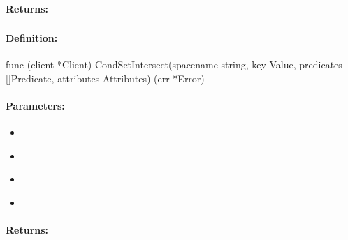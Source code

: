\paragraph{Returns:}


\pagebreak
\subsubsection{}
\label{api:Go:CondSetIntersect}


\paragraph{Definition:}
\begin{gocode}
func (client *Client) CondSetIntersect(spacename string, key Value, predicates []Predicate, attributes Attributes) (err *Error)
\end{gocode}

\paragraph{Parameters:}
\begin{itemize}[noitemsep]
\item {}\\

\item {}\\

\item {}\\

\item {}\\

\end{itemize}

\paragraph{Returns:}


\pagebreak
\subsubsection{}
\label{api:Go:GroupSetIntersect}


